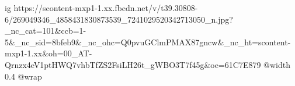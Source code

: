  
 
 
 
 

\ifcmt
  ig https://scontent-mxp1-1.xx.fbcdn.net/v/t39.30808-6/269049346_4858431830873539_7241029520342713050_n.jpg?_nc_cat=101&ccb=1-5&_nc_sid=8bfeb9&_nc_ohc=Q0pvuGClmPMAX87gncw&_nc_ht=scontent-mxp1-1.xx&oh=00_AT-Qrnzx4eV1ptHWQ7vhbTfZS2FsiLH26t_gWBO3T7f45g&oe=61C7E879
  @width 0.4
  @wrap 
\fi
